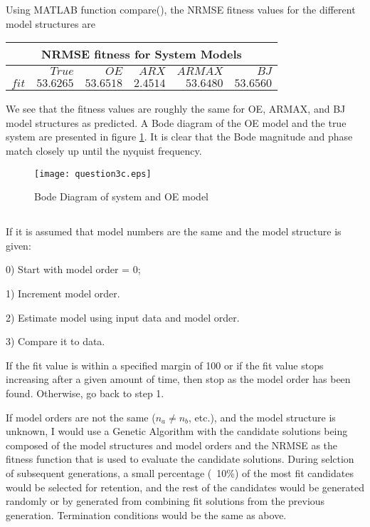 \documentclass[times,12pt,reqno]{amsart}
\begin{document}
Using MATLAB function compare(), the NRMSE fitness values for the different
model structures are

\begin{center}
    \begin{tabular} {|r|r|r|r|r|r|}
        \hline
        \multicolumn{6}{|c|}{NRMSE fitness for System Models} \\
        \hline
        \nonumber & ${True}$ & ${OE}$ & ${ARX}$ & ${ARMAX}$ & ${BJ}$ \\
        \hline
        $fit$ & $53.6265$ & $53.6518$ & $2.4514$ & $53.6480$ & $53.6560$ \\
        \hline
    \end{tabular}
\end{center}

We see that the fitness values are roughly the same for OE, ARMAX, and BJ model
structures as predicted. A Bode diagram of the OE model and the true system are
presented in figure \ref{fig:q3c}. It is clear that the Bode magnitude and
phase match closely up until the nyquist frequency.

\begin{figure}
    \begin{center}
        \texttt{[image: question3c.eps]}
    \end{center}
    \caption{Bode Diagram of system and OE model}
    \label{fig:q3c}
\end{figure}

\subsection{}
If it is assumed that model numbers are the same and the model structure is
given:

0) Start with model order = 0;

1) Increment model order.

2) Estimate model using input data and model order.

3) Compare it to data.

If the fit value is within a specified margin of 100 or
if the fit value stops increasing after a given amount of time, then stop as
the model order has been found. Otherwise, go back to step 1.

If model orders are not the same ($ n_a \neq n_b $, etc.), and the model
structure is unknown, I would use a Genetic Algorithm with the candidate
solutions being composed of the model structures and model orders and the NRMSE
as the fitness function that is used to evaluate the candidate solutions.
During selction of subsequent generations, a small percentage (~10\%) of the
most fit candidates would be selected for retention, and the rest of the
candidates would be generated randomly or by generated from combining fit
solutions from the previous generation. Termination conditions would be the
same as above.
\end{document}
